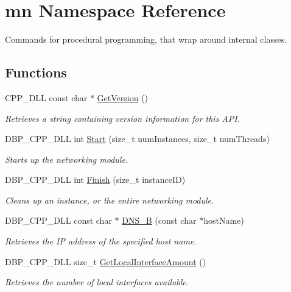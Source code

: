 \hypertarget{namespacemn}{
\section{mn Namespace Reference}
\label{namespacemn}
}


Commands for procedural programming, that wrap around internal classes.  


\subsection*{Functions}
\begin{DoxyCompactItemize}
\item 
CPP\_\-DLL const char $\ast$ \hyperlink{namespacemn_a33f31fabf86b8a77c70215819b77f7fc}{GetVersion} ()
\begin{DoxyCompactList}\small\item\em Retrieves a string containing version information for this API. \item\end{DoxyCompactList}\item 
DBP\_\-CPP\_\-DLL int \hyperlink{namespacemn_a4452d09215e972009fc5985a61ae7d04}{Start} (size\_\-t numInstances, size\_\-t numThreads)
\begin{DoxyCompactList}\small\item\em Starts up the networking module. \item\end{DoxyCompactList}\item 
DBP\_\-CPP\_\-DLL int \hyperlink{namespacemn_a99612581b485e5059ba0c1c6e6d4d548}{Finish} (size\_\-t instanceID)
\begin{DoxyCompactList}\small\item\em Cleans up an instance, or the entire networking module. \item\end{DoxyCompactList}\item 
DBP\_\-CPP\_\-DLL const char $\ast$ \hyperlink{namespacemn_a99d80371f7aecc638eb1ef1f74534794}{DNS\_\-B} (const char $\ast$hostName)
\begin{DoxyCompactList}\small\item\em Retrieves the IP address of the specified host name. \item\end{DoxyCompactList}\item 
DBP\_\-CPP\_\-DLL size\_\-t \hyperlink{namespacemn_a06a84484274b0f3184c226b5e70496ef}{GetLocalInterfaceAmount} ()
\begin{DoxyCompactList}\small\item\em Retrieves the number of local interfaces available. \item\end{DoxyCompactList}\item 

\end{DoxyCompactItemize}
